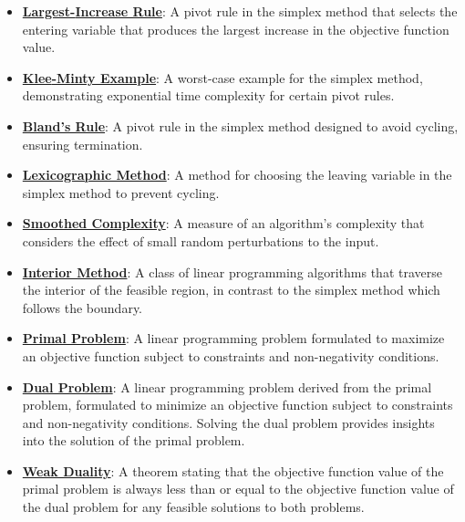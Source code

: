 \documentclass{article}%
\begin{document}
\begin{itemize}[leftmargin=*]
\item \href{https://www.math.purdue.edu/~yipn/421/2024-09-05-SimplexEfficiency.pdf#page=6}{\textbf{Largest{-}Increase Rule}}: A pivot rule in the simplex method that selects the entering variable that produces the largest increase in the objective function value.%
\item \href{https://www.math.purdue.edu/~yipn/421/2024-09-05-SimplexEfficiency.pdf#page=2}{\textbf{Klee{-}Minty Example}}: A worst-case example for the simplex method, demonstrating exponential time complexity for certain pivot rules.%
\item \href{https://www.math.purdue.edu/~yipn/421/2024-09-05-SimplexEfficiency.pdf#page=10}{\textbf{Bland's Rule}}: A pivot rule in the simplex method designed to avoid cycling, ensuring termination.%
\item \href{https://www.math.purdue.edu/~yipn/421/2024-09-05-SimplexEfficiency.pdf#page=10}{\textbf{Lexicographic Method}}: A method for choosing the leaving variable in the simplex method to prevent cycling.%
\item \href{https://www.math.purdue.edu/~yipn/421/2024-09-05-SimplexEfficiency.pdf#page=11}{\textbf{Smoothed Complexity}}: A measure of an algorithm's complexity that considers the effect of small random perturbations to the input.%
\item \href{https://www.math.purdue.edu/~yipn/421/2024-09-05-SimplexEfficiency.pdf#page=12}{\textbf{Interior Method}}: A class of linear programming algorithms that traverse the interior of the feasible region, in contrast to the simplex method which follows the boundary.%
\item \href{https://www.math.purdue.edu/~yipn/421/2024-09-12-Duality.pdf#page=1}{\textbf{Primal Problem}}: A linear programming problem formulated to maximize an objective function subject to constraints and non-negativity conditions.%
\item \href{https://www.math.purdue.edu/~yipn/421/2024-09-12-Duality.pdf#page=1}{\textbf{Dual Problem}}: A linear programming problem derived from the primal problem, formulated to minimize an objective function subject to constraints and non-negativity conditions. Solving the dual problem provides insights into the solution of the primal problem.%
\item \href{https://www.math.purdue.edu/~yipn/421/2024-09-12-Duality.pdf#page=2}{\textbf{Weak Duality}}: A theorem stating that the objective function value of the primal problem is always less than or equal to the objective function value of the dual problem for any feasible solutions to both problems.%

\end{itemize}
\end{document}
